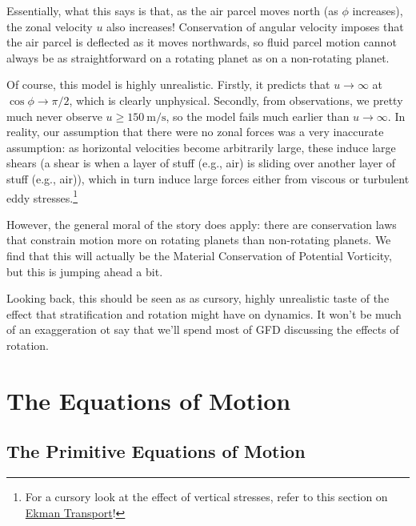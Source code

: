 Essentially, what this says is that, as the air parcel moves north (as $\phi$ increases), the zonal velocity $u$ also increases! Conservation of angular velocity imposes that the air parcel is deflected as it moves northwards, so fluid parcel motion cannot always be as straightforward on a rotating planet as on a non-rotating planet.

Of course, this model is highly unrealistic. Firstly, it predicts that $u\to\infty$ at $\cos\phi\to\pi/2$, which is clearly unphysical. Secondly, from observations, we pretty much never observe $u\geq\qty{150}{\metre\per\second}$, so the model fails much earlier than $u\to\infty$. In reality, our assumption that there were no zonal forces was a very inaccurate assumption: as horizontal velocities become arbitrarily large, these induce large shears (a shear is when a layer of stuff (e.g., air) is sliding over another layer of stuff (e.g., air)), which in turn induce large forces either from viscous or turbulent eddy stresses.\footnote{For a cursory look at the effect of vertical stresses, refer to this section on \hyperref[Ekman Transport]{Ekman Transport}!}

However, the general moral of the story does apply: there are conservation laws that constrain motion more on rotating planets than non-rotating planets. We find that this will actually be the Material Conservation of Potential Vorticity, but this is jumping ahead a bit.

Looking back, this should be seen as as cursory, highly unrealistic taste of the effect that stratification and rotation might have on dynamics. It won't be much of an exaggeration ot say that we'll spend most of GFD discussing the effects of rotation.

\chapter{The Equations of Motion}\label{EoM GFD}

\section{The Primitive Equations of Motion}

